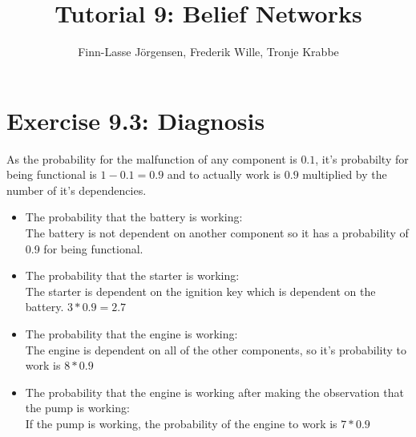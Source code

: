 \documentclass[12pt,a4paper]{article}
\author{Finn-Lasse Jörgensen, Frederik Wille, Tronje Krabbe}
\title{Tutorial 9: Belief Networks}
\begin{document}
\maketitle

\section*{Exercise 9.3: Diagnosis}

As the probability for the malfunction of any component is $0.1$, it's probabilty for being functional is $1-0.1 = 0.9$ and to actually work is $0.9$ multiplied by the number of it's dependencies.
\begin{itemize}
\item The probability that the battery is working: \\
    The battery is not dependent on another component so it has a probability of 0.9 for being functional.
\item The probability that the starter is working: \\
    The starter is dependent on the ignition key which is dependent on the battery. $ 3*0.9 = 2.7 $
\item The probability that the engine is working: \\
    The engine is dependent on all of the other components, so it's probability to work is $ 8 * 0.9 $
\item The probability that the engine is working after making the observation that the pump is working: \\
    If the pump is working, the probability of the engine to work is $ 7 * 0.9 $
\end{itemize}
\end{document}
